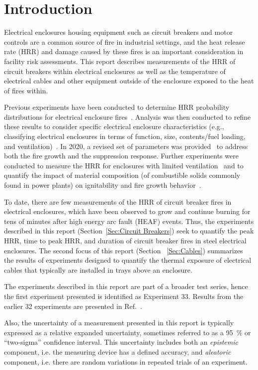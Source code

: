\section{Introduction}

Electrical enclosures housing equipment such as circuit breakers and motor controls are a common source of fire in industrial settings, and the heat release rate (HRR) and damage caused by these fires is an important consideration in facility risk assessments. This report describes measurements of the HRR of circuit breakers within electrical enclosures as well as the temperature of electrical cables and other equipment outside of the enclosure exposed to the heat of fires within.

Previous experiments have been conducted to determine HRR probability distributions for electrical enclosure fires~\cite{NUREG/CR-7197}. Analysis was then conducted to refine these results to consider specific electrical enclosure characteristics (e.g., classifying electrical enclosures in terms of function, size, contents/fuel loading, and ventilation)~\cite{NUREG-2178}. In 2020, a revised set of parameters was provided~\cite{NUREG2230} to address both the fire growth and the suppression response. Further experiments were conducted to measure the HRR for enclosures with limited ventilation~\cite{OLIVE-FIRE} and to quantify the impact of material composition (of combustible solids commonly found in power plants) on ignitability and fire growth behavior~\cite{leventon2024nist}.

To date, there are few measurements of the HRR of circuit breaker fires in electrical enclosures, which have been observed to grow and continue burning for tens of minutes after high energy arc fault (HEAF) events. Thus, the experiments described in this report (Section~\ref{Sec:Circuit Breakers}) seek to quantify the peak HRR, time to peak HRR, and duration of circuit breaker fires in steel electrical enclosures. The second focus of this report (Section~ \ref{Sec:Cables}) summarizes the results of experiments designed to quantify the thermal exposure of electrical cables that typically are installed in trays above an enclosure.

The experiments described in this report are part of a broader test series, hence the first experiment presented is identified as Experiment 33. Results from the earlier 32 experiments are presented in Ref.~\cite{OLIVE-FIRE}.

Also, the uncertainty of a measurement presented in this report is typically expressed as a relative expanded uncertainty, sometimes referred to as a 95~\% or ``two-sigma'' confidence interval. This uncertainty includes both an {\em epistemic} component, i.e. the measuring device has a defined accuracy, and {\em aleatoric} component, i.e. there are random variations in repeated trials of an experiment.

